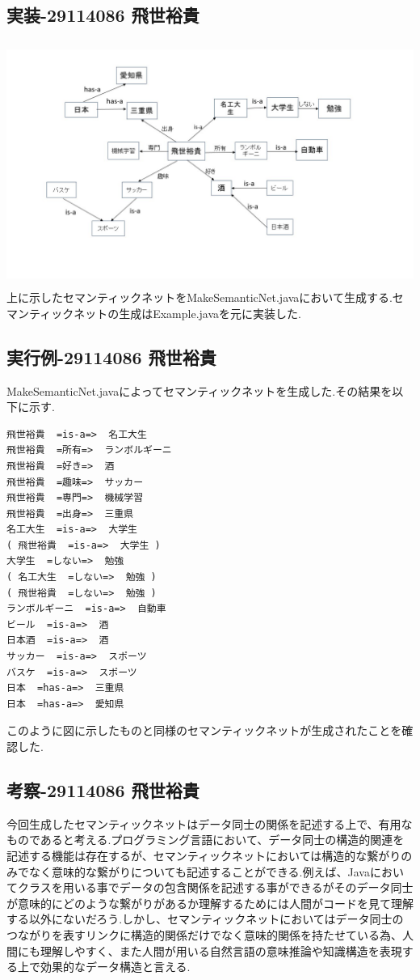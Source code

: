 \documentclass{jarticle}
\begin{document}
\subsection{実装-29114086 飛世裕貴}
\includegraphics[width=150mm,height=80mm]{086/Slide2.jpg}
上に示したセマンティックネットをMakeSemanticNet.javaにおいて生成する.セマンティックネットの生成はExample.javaを元に実装した.

\subsection{実行例-29114086 飛世裕貴}
MakeSemanticNet.javaによってセマンティックネットを生成した.その結果を以下に示す.

\begin{screen}
\begin{verbatim}
飛世裕貴  =is-a=>  名工大生
飛世裕貴  =所有=>  ランボルギーニ
飛世裕貴  =好き=>  酒
飛世裕貴  =趣味=>  サッカー
飛世裕貴  =専門=>  機械学習
飛世裕貴  =出身=>  三重県
名工大生  =is-a=>  大学生
( 飛世裕貴  =is-a=>  大学生 )
大学生  =しない=>  勉強
( 名工大生  =しない=>  勉強 )
( 飛世裕貴  =しない=>  勉強 )
ランボルギーニ  =is-a=>  自動車
ビール  =is-a=>  酒
日本酒  =is-a=>  酒
サッカー  =is-a=>  スポーツ
バスケ  =is-a=>  スポーツ
日本  =has-a=>  三重県
日本  =has-a=>  愛知県
\end{verbatim}
\end{screen}

このように図に示したものと同様のセマンティックネットが生成されたことを確認した.

\subsection{考察-29114086 飛世裕貴}
今回生成したセマンティックネットはデータ同士の関係を記述する上で、有用なものであると考える.プログラミング言語において、データ同士の構造的関連を記述する機能は存在するが、セマンティックネットにおいては構造的な繋がりのみでなく意味的な繋がりについても記述することができる.例えば、Javaにおいてクラスを用いる事でデータの包含関係を記述する事ができるがそのデータ同士が意味的にどのような繋がりがあるか理解するためには人間がコードを見て理解する以外にないだろう.しかし、セマンティックネットにおいてはデータ同士のつながりを表すリンクに構造的関係だけでなく意味的関係を持たせている為、人間にも理解しやすく、また人間が用いる自然言語の意味推論や知識構造を表現する上で効果的なデータ構造と言える.
\end{document}
